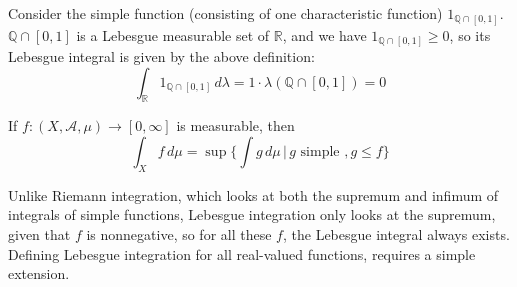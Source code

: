 \documentclass{article}
\begin{document}
      \begin{example}
        Consider the simple function (consisting of one characteristic function) $1_{\mathbb{Q} \cap [0, 1]}$. $\mathbb{Q} \cap [0, 1]$ is a Lebesgue measurable set of $\mathbb{R}$, and we have $1_{\mathbb{Q} \cap [0, 1]} \geq 0$, so its Lebesgue integral is given by the above definition: 
        \begin{equation}
          \int_{\mathbb{R}} 1_{\mathbb{Q} \cap [0, 1]} \, d\lambda = 1 \cdot \lambda(\mathbb{Q} \cap [0, 1]) = 0
        \end{equation}
      \end{example}

      \begin{definition}
        If $f: (X, \mathcal{A}, \mu) \longrightarrow [0, \infty]$ is measurable, then 
        \begin{equation}
          \int_X f \, d\mu = \sup \Big\{ \int g\, d\mu \,\Big|\, g \text{ simple }, g \leq f\Big\}
        \end{equation}
      \end{definition}

      Unlike Riemann integration, which looks at both the supremum and infimum of integrals of simple functions, Lebesgue integration only looks at the supremum, given that $f$ is nonnegative, so for all these $f$, the Lebesgue integral always exists. Defining Lebesgue integration for all real-valued functions, requires a simple extension. 
\end{document}
